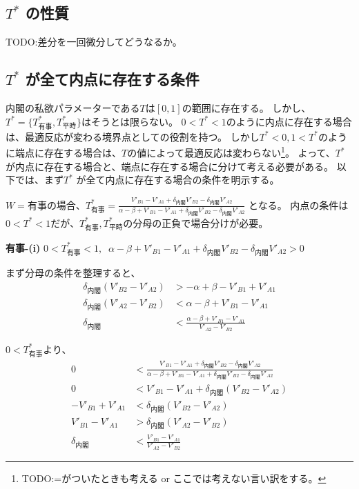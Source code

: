 \documentclass[main.tex]{subfiles}
\begin{document}
\subsection{$T^*$ の性質}

TODO:差分を一回微分してどうなるか。






\subsection{$T^*$ が全て内点に存在する条件}

内閣の私欲パラメーターである$T$は$[0,1]$の範囲に存在する。
しかし、$T^* = \lbrace T^*_{有事}, T^*_{平時} \rbrace$はそうとは限らない。
$0<T^*<1$のように内点に存在する場合は、最適反応が変わる境界点としての役割を持つ。
しかし$T^*<0,1<T^*$のように端点に存在する場合は、$T$の値によって最適反応は変わらない\footnote{TODO:=がついたときも考える or ここでは考えない言い訳をする。}。
よって、$T^*$が内点に存在する場合と、端点に存在する場合に分けて考える必要がある。
以下では、まず$T^*$ が全て内点に存在する場合の条件を明示する。


$W=有事$の場合、$T^*_{有事} = \frac{ V'_{B1} - V'_{A1} +\delta_{内閣}V'_{B2} - \delta_{内閣}V'_{A2} }{ \alpha-\beta + V'_{B1}-V'_{A1} + \delta_{内閣}V'_{B2} - \delta_{内閣}V'_{A2} }$
となる。
内点の条件は$0<T^*<1$だが、$T^*_{有事}, T^*_{平時}$の分母の正負で場合分けが必要。

\bigskip
\noindent
\textbf{有事-(i)}\; $0<T^*_{有事}<1,\;\;\alpha-\beta + V'_{B1}-V'_{A1} + \delta_{内閣}V'_{B2} - \delta_{内閣}V'_{A2} > 0$

まず分母の条件を整理すると、
\begin{align*}
    \delta_{内閣}(V'_{B2} - V'_{A2}) &> -\alpha+\beta - V'_{B1}+V'_{A1} \\
    \delta_{内閣}(V'_{A2} - V'_{B2}) &< \alpha-\beta + V'_{B1}-V'_{A1}\\
    \delta_{内閣} &< \frac{\alpha-\beta + V'_{B1}-V'_{A1}}{V'_{A2} - V'_{B2}} 
\end{align*}

$0<T^*_{有事}$より、
\begin{align*}
    0 &< \frac{ V'_{B1} - V'_{A1} +\delta_{内閣}V'_{B2} - \delta_{内閣}V'_{A2} }{ \alpha-\beta + V'_{B1}-V'_{A1} + \delta_{内閣}V'_{B2} - \delta_{内閣}V'_{A2} }\\
    0 &<  V'_{B1} - V'_{A1} +\delta_{内閣}(V'_{B2} - V'_{A2})\\
    -V'_{B1} + V'_{A1} &< \delta_{内閣}(V'_{B2} - V'_{A2})\\
    V'_{B1} - V'_{A1} &> \delta_{内閣}(V'_{A2} - V'_{B2})\\
    \delta_{内閣} &< \frac{V'_{B1} - V'_{A1}}{V'_{A2} - V'_{B2}}
\end{align*}
\end{document}
